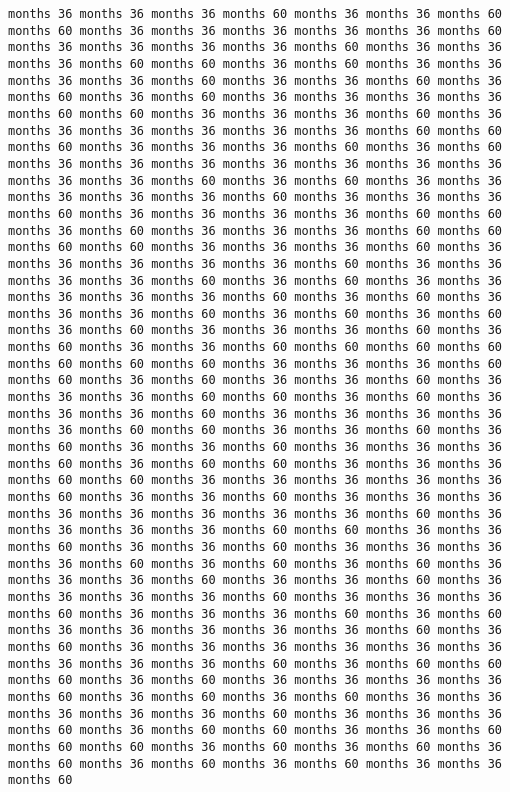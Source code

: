 \documentclass[11pt]{article}
\begin{document}
\begin{Verbatim}[commandchars=\\\{\}, frame=single, framerule=2mm, rulecolor=\color{outerrorbackground}]
months 36 months 36 months 36 months 60 months 36 months 36 months 60 months 60 months 36 months 36 months 36 months 36 months 36 months 60 months 36 months 36 months 36 months 36 months 60 months 36 months 36 months 36 months 60 months 60 months 36 months 60 months 36 months 36 months 36 months 36 months 60 months 36 months 36 months 60 months 36 months 60 months 36 months 60 months 36 months 36 months 36 months 36 months 60 months 60 months 36 months 36 months 36 months 60 months 36 months 36 months 36 months 36 months 36 months 36 months 60 months 60 months 60 months 36 months 36 months 36 months 60 months 36 months 60 months 36 months 36 months 36 months 36 months 36 months 36 months 36 months 36 months 36 months 60 months 36 months 60 months 36 months 36 months 36 months 36 months 36 months 60 months 36 months 36 months 36 months 60 months 36 months 36 months 36 months 36 months 60 months 60 months 36 months 60 months 36 months 36 months 36 months 60 months 60 months 60 months 60 months 36 months 36 months 36 months 60 months 36 months 36 months 36 months 36 months 36 months 60 months 36 months 36 months 36 months 36 months 60 months 36 months 60 months 36 months 36 months 36 months 36 months 36 months 60 months 36 months 60 months 36 months 36 months 36 months 60 months 36 months 60 months 36 months 60 months 36 months 60 months 36 months 36 months 36 months 60 months 36 months 60 months 36 months 36 months 60 months 60 months 60 months 60 months 60 months 60 months 60 months 36 months 36 months 36 months 60 months 60 months 36 months 60 months 36 months 36 months 60 months 36 months 36 months 36 months 60 months 60 months 36 months 60 months 36 months 36 months 36 months 60 months 36 months 36 months 36 months 36 months 36 months 60 months 60 months 36 months 36 months 60 months 36 months 60 months 36 months 36 months 60 months 36 months 36 months 36 months 60 months 36 months 60 months 60 months 36 months 36 months 36 months 60 months 60 months 36 months 36 months 36 months 36 months 36 months 60 months 36 months 36 months 60 months 36 months 36 months 36 months 36 months 36 months 36 months 36 months 36 months 60 months 36 months 36 months 36 months 36 months 60 months 60 months 36 months 36 months 60 months 36 months 36 months 60 months 36 months 36 months 36 months 36 months 60 months 36 months 60 months 36 months 60 months 36 months 36 months 36 months 60 months 36 months 36 months 60 months 36 months 36 months 36 months 36 months 60 months 36 months 36 months 36 months 60 months 36 months 36 months 36 months 60 months 36 months 60 months 36 months 36 months 36 months 36 months 36 months 60 months 36 months 60 months 36 months 36 months 36 months 36 months 36 months 36 months 36 months 36 months 36 months 60 months 36 months 60 months 60 months 60 months 36 months 60 months 36 months 36 months 36 months 36 months 60 months 36 months 60 months 36 months 60 months 36 months 36 months 36 months 36 months 36 months 60 months 36 months 36 months 36 months 60 months 36 months 60 months 60 months 36 months 36 months 60 months 60 months 60 months 36 months 60 months 36 months 60 months 36 months 60 months 36 months 60 months 36 months 60 months 36 months 36 months 60 
\end{Verbatim}
\end{document}
